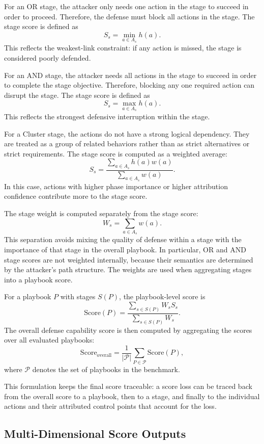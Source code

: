 For an OR stage, the attacker only needs one action in the stage to succeed in order to proceed. Therefore, the defense must block all actions in the stage. The stage score is defined as
\[
S_s = \min_{a \in A_s} h(a).
\]
This reflects the weakest-link constraint: if any action is missed, the stage is considered poorly defended.

For an AND stage, the attacker needs all actions in the stage to succeed in order to complete the stage objective. Therefore, blocking any one required action can disrupt the stage. The stage score is defined as
\[
S_s = \max_{a \in A_s} h(a).
\]
This reflects the strongest defensive interruption within the stage.

For a Cluster stage, the actions do not have a strong logical dependency. They are treated as a group of related behaviors rather than as strict alternatives or strict requirements. The stage score is computed as a weighted average:
\[
S_s =
\frac{\sum_{a \in A_s} h(a) w(a)}
     {\sum_{a \in A_s} w(a)}.
\]
In this case, actions with higher phase importance or higher attribution confidence contribute more to the stage score.

The stage weight is computed separately from the stage score:
\[
W_s = \sum_{a \in A_s} w(a).
\]
This separation avoids mixing the quality of defense within a stage with the importance of that stage in the overall playbook. In particular, OR and AND stage scores are not weighted internally, because their semantics are determined by the attacker's path structure. The weights are used when aggregating stages into a playbook score.

For a playbook $P$ with stages $S(P)$, the playbook-level score is
\[
\mathrm{Score}(P) =
\frac{\sum_{s \in S(P)} W_s S_s}
     {\sum_{s \in S(P)} W_s}.
\]
The overall defense capability score is then computed by aggregating the scores over all evaluated playbooks:
\[
\mathrm{Score}_{\mathrm{overall}} =
\frac{1}{|\mathcal{P}|}
\sum_{P \in \mathcal{P}} \mathrm{Score}(P),
\]
where $\mathcal{P}$ denotes the set of playbooks in the benchmark.

This formulation keeps the final score traceable: a score loss can be traced back from the overall score to a playbook, then to a stage, and finally to the individual actions and their attributed control points that account for the loss.

\subsection{Multi-Dimensional Score Outputs}
\label{subsec:multi-dimensional-outputs}

